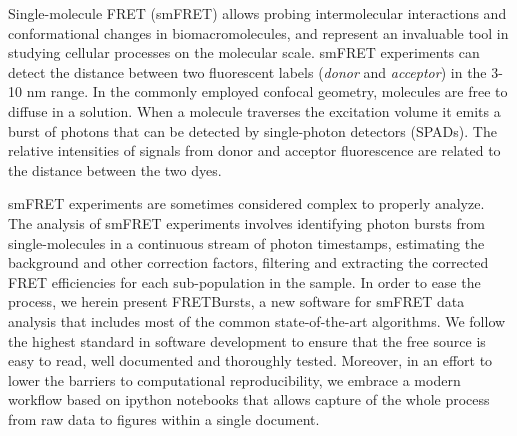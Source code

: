 Single-molecule FRET (smFRET) allows probing intermolecular interactions and conformational changes in biomacromolecules, and represent an invaluable tool in studying cellular processes on the molecular scale\cite{Kapanidis_2006}. smFRET experiments can detect the distance between two fluorescent labels (\textit{donor} and \textit{acceptor}) in the 3-10 nm range. In the commonly employed confocal geometry, molecules are free to diffuse in a solution. When a molecule traverses the excitation volume it emits a burst of photons that can be detected by single-photon detectors (SPADs). 
The relative intensities of signals from donor and acceptor fluorescence are related to the distance between the two dyes.

smFRET experiments are sometimes considered complex to properly analyze. The analysis of smFRET experiments involves identifying photon bursts from single-molecules in a continuous stream of photon timestamps, estimating the background and other correction factors, filtering and extracting the corrected FRET efficiencies for each sub-population in the sample. In order to ease the process, we herein present FRETBursts, a new software for smFRET data analysis that includes most of the common state-of-the-art algorithms. We follow the highest standard in software development to ensure that the free source is easy to read, well documented and thoroughly tested. Moreover, in an effort to lower the barriers to computational reproducibility, we embrace a modern workflow based on ipython notebooks that allows capture of the whole process from raw data to figures within a single document.
